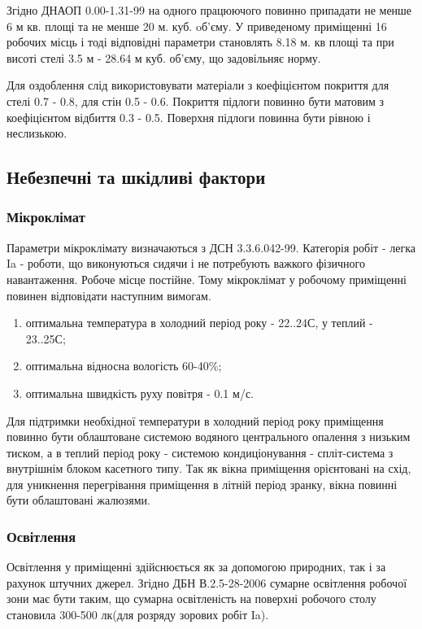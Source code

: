     Згідно ДНАОП 0.00-1.31-99\cite{lab-dnaop} на одного працюючого повинно припадати не менше 6 м кв. площі та не менше 20 м. куб. oб'єму.
    У приведеному приміщенні 16 робочих місць і тоді відповідні параметри становлять 8.18 м. кв площі та при висоті стелі 3.5 м -  28.64 м куб. об'єму,
    що задовільняє норму.

    Для оздоблення слід використовувати матеріали з коефіцієнтом покриття для стелі 0.7 - 0.8, для стін 0.5 - 0.6.
    Покриття підлоги повинно бути матовим з коефіцієнтом відбиття 0.3 - 0.5. Поверхня підлоги повинна бути рівною і неслизькою.

\subsection{Небезпечні та шкідливі фактори}
    \subsubsection{Мікроклімат}
    Параметри мікроклімату визначаються з ДСН 3.3.6.042-99\cite{lab-dsn42}. Категорія робіт - легка Ia - роботи, що виконуються сидячи і не потребують
    важкого фізичного навантаження. Робоче місце постійне. Тому мікроклімат у робочому приміщенні повинен відповідати наступним вимогам.
    \begin{enumerate}
        \item оптимальна температура в холодний період року - 22..24С, у теплий - 23..25С;
        \item оптимальна відносна вологість 60-40\%;
        \item оптимальна швидкість руху повітря - 0.1 м/с.
    \end{enumerate}

    Для підтримки необхідної температури в холодний період року приміщення повинно бути облаштоване системою водяного центрального опалення з низьким тиском,
    а в теплий період року - системою кондиціонування -  спліт-система з внутрішнім блоком касетного типу.
    Так як вікна приміщення орієнтовані на схід, для уникнення перегрівання приміщення в літній період зранку, вікна повинні бути облаштовані жалюзями.

    \subsubsection{Освітлення}
    Освітлення у приміщенні здійснюється як за допомогою природних, так і за рахунок штучних джерел.
    Згідно ДБН В.2.5-28-2006\cite{lab-dbn28} сумарне освітлення робочої зони має бути таким, що сумарна освітленість на поверхні робочого столу становила 300-500 лк(для розряду зорових робіт Ia).


